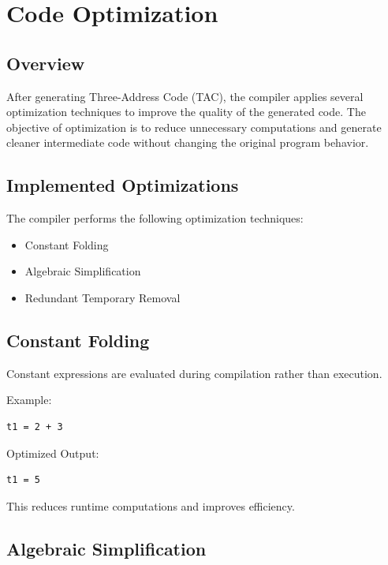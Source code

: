 \documentclass[12pt,a4paper]{report}
\begin{document}
\chapter{Code Optimization}

\section{Overview}

After generating Three-Address Code (TAC), the compiler applies several optimization techniques to improve the quality of the generated code. The objective of optimization is to reduce unnecessary computations and generate cleaner intermediate code without changing the original program behavior.

\section{Implemented Optimizations}

The compiler performs the following optimization techniques:

\begin{itemize}
    \item Constant Folding
    \item Algebraic Simplification
    \item Redundant Temporary Removal
\end{itemize}

\section{Constant Folding}

Constant expressions are evaluated during compilation rather than execution.

Example:

\begin{lstlisting}
t1 = 2 + 3
\end{lstlisting}

Optimized Output:

\begin{lstlisting}
t1 = 5
\end{lstlisting}

This reduces runtime computations and improves efficiency.

\section{Algebraic Simplification}
\end{document}

